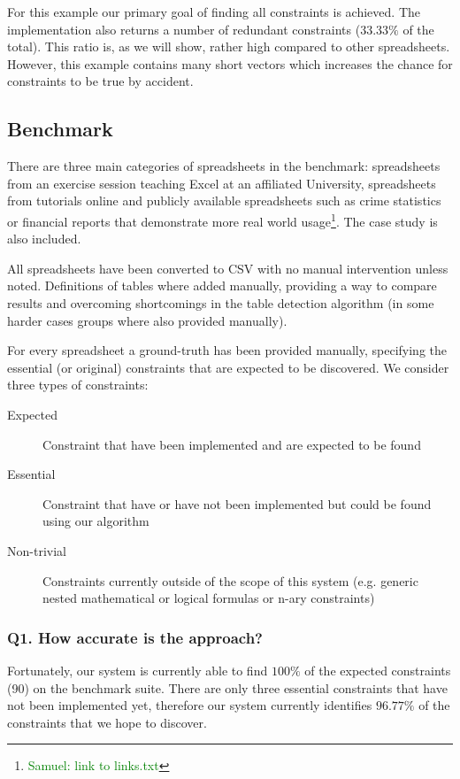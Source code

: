 \documentclass{ecai}
\newcommand{\samuel}[1]{\textcolor{green}{{\sc Samuel:} #1}\xspace}
\begin{document}
For this example our primary goal of finding all constraints is achieved.
The implementation also returns a number of redundant constraints ($33.33\%$ of the total).
This ratio is, as we will show, rather high compared to other spreadsheets.
However, this example contains many short vectors which increases the chance for constraints to be true by accident.

\subsection{Benchmark}
There are three main categories of spreadsheets in the benchmark: spreadsheets from an exercise session teaching Excel at an affiliated University, spreadsheets from tutorials online and publicly available spreadsheets such as crime statistics or financial reports that demonstrate more real world usage\footnote{\samuel{link to links.txt}}.
The case study is also included.

All spreadsheets have been converted to CSV with no manual intervention unless noted.
Definitions of tables where added manually, providing a way to compare results and overcoming shortcomings in the table detection algorithm (in some harder cases groups where also provided manually).

For every spreadsheet a ground-truth has been provided manually, specifying the essential (or original) constraints that are expected to be discovered.
We consider three types of constraints:
\begin{description}
  \item[Expected] Constraint that have been implemented and are expected to be found
  \item[Essential] Constraint that have or have not been implemented but could be found using our algorithm
  \item[Non-trivial] Constraints currently outside of the scope of this system (e.g. generic nested mathematical or logical formulas or n-ary constraints)
\end{description}

\subsubsection*{Q1. How accurate is the approach?}
Fortunately, our system is currently able to find $100\%$ of the expected constraints (90) on the benchmark suite.
There are only three essential constraints that have not been implemented yet, therefore our system currently identifies $96.77\%$ of the constraints that we hope to discover.
\end{document}
